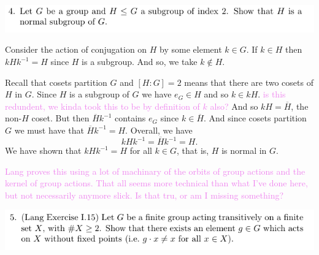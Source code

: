 \documentclass[12pt,letterpaper,boxed]{hmcpset}
\newcommand{\wg}[1]{\textcolor{violet}{#1}}
\newcommand{\inv}{^{-1}}
\begin{document}
\newpage


\begin{problem}
	\includegraphics[scale=0.8]{4.png}
	\hfill
\end{problem}

\begin{solution}
Consider the action of conjugation on $H$ by some element $k \in G$.
If $k \in H$ then $k H k \inv = H$ since $H$ is a subgroup. And so, we
take $k \not \in H$.

Recall that cosets partition $G$ and $[H:G] = 2$ means that there are
two cosets of $H$ in $G$. Since $H$ is a subgroup of $G$ we have $e_G
\in H$ and so $k \in k H$. \wg{is this redundent, we kinda took this
to be by definition of $k$ also?}
And so $k H = \overline H$, the non-$H$ coset. But then $\overline H
k\inv$ contains $e_G$ since $k \in \overline H$. And since cosets
partition $G$ we must have that $\overline H k\inv = H$. Overall, we
have \[
	k H k\inv = \overline H k \inv = H.
\]
We have shown that $k H k\inv = H$ for all $k \in G$, that is, $H$ is
normal in $G$.

\wg{Lang proves this using a lot of machinary of the orbits of group
actions and the kernel of group actions. That all seems more technical
than what I've done here, but not necessarily anymore slick. Is that
tru, or am I missing something?}

\end{solution}

\newpage



\begin{problem}
	\includegraphics[scale=0.8]{5.png}
	\hfill
\end{problem}

\begin{solution}
\end{solution}

\newpage

\end{document}
